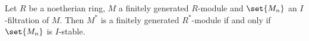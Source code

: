 Let $R$ be a noetherian ring, $M$ a finitely generated $R$-module and
$\set{M_n}$ an $I$-filtration of $M$. Then $M^*$ is a finitely generated
$R^*$-module if and only if  $\set{M_n}$ is $I$-stable.
